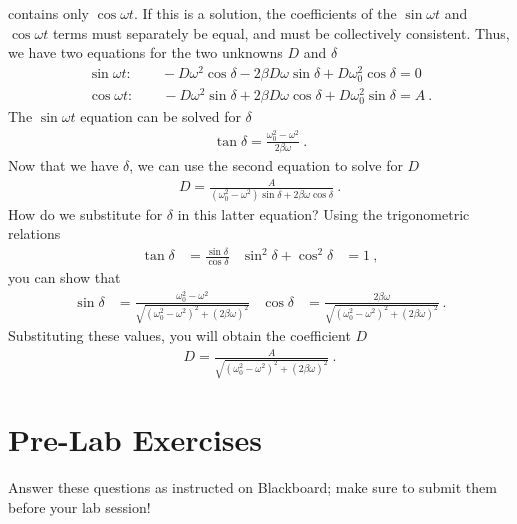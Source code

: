\documentclass[12pt]{article}
\begin{document}
contains only $\cos\omega t$.  If this is a solution, the coefficients
of the $\sin\omega t$ and $\cos\omega t$ terms must separately be
equal, and must be collectively consistent.  Thus, we have two
equations for the two unknowns $D$ and $\delta$
\begin{gather*}
  \sin\omega t: \qquad -D\omega^2 \cos\delta - 2\beta D\omega
  \sin\delta + D\omega_0^2 \cos\delta = 0\\
  \cos\omega t: \qquad -D\omega^2 \sin\delta + 2\beta D\omega
  \cos\delta + D\omega_0^2 \sin\delta = A\ .
\end{gather*}
The $\sin\omega t$ equation can be solved for $\delta$
\begin{gather*}
  \tan\delta = \frac{\omega_0^2 - \omega^2}{2\beta\omega}\ .
\end{gather*}
Now that we have $\delta$, we can use the second equation to solve for
$D$
\begin{gather*}
  D = \frac{A}{\left(\omega_0^2-\omega^2\right) \sin\delta +
    2\beta\omega \cos\delta}\ .
\end{gather*}
How do we substitute for $\delta$ in this latter equation?  Using the
trigonometric relations
\begin{align*}
  \tan\delta &= \frac{\sin\delta}{\cos\delta} & 
  \sin^2\delta + \cos^2 \delta &= 1\ ,
\end{align*}
you can show that
\begin{align*}
  \sin\delta &= \frac{\omega_0^2 -
    \omega^2}{\sqrt{\left(\omega_0^2-\omega^2\right)^2 +
      \left(2\beta\omega\right)^2}} & 
  \cos\delta &=
  \frac{2\beta\omega}{\sqrt{\left(\omega_0^2-\omega^2\right)^2 + 
      \left(2\beta\omega\right)^2}}\ .
\end{align*}
Substituting these values, you will obtain the coefficient $D$
\begin{gather*}
  D = \frac{A}{\sqrt{\left(\omega_0^2-\omega^2\right)^2 + 
      \left(2\beta\omega\right)^2}}\ .
\end{gather*}


\newpage
 
\section*{Pre-Lab Exercises}

Answer these questions as instructed on Blackboard; make sure to
submit them before your lab session!
\end{document}
